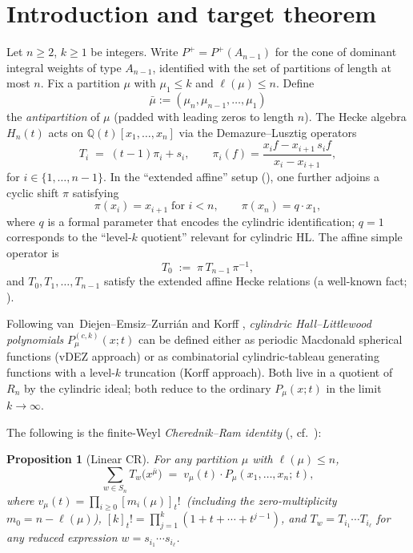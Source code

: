 \documentclass[11pt]{article}
\newtheorem{proposition}[theorem]{Proposition}
\theoremstyle{definition}
\newcommand{\bmu}{\bar{\mu}}
\newcommand{\Q}{\mathbb{Q}}
\newcommand{\Sn}{S_n}
\begin{document}
\section{Introduction and target theorem}
\label{sec:intro}

Let $n \ge 2$, $k \ge 1$ be integers. Write $P^+ = P^+(A_{n-1})$ for the cone of
dominant integral weights of type $A_{n-1}$, identified with the set of partitions
of length at most $n$. Fix a partition $\mu$ with $\mu_1 \le k$ and $\ell(\mu) \le n$.
Define
\[
\bmu := (\mu_n, \mu_{n-1}, \ldots, \mu_1)
\]
the \emph{antipartition} of $\mu$ (padded with leading zeros to length $n$).
The Hecke algebra $H_n(t)$ acts on $\Q(t)[x_1, \ldots, x_n]$ via the
Demazure--Lusztig operators
\[
T_i \;=\; (t-1)\pi_i + s_i, \qquad
\pi_i(f) = \frac{x_i f - x_{i+1}\, s_i f}{x_i - x_{i+1}},
\]
for $i \in \{1, \ldots, n-1\}$. In the ``extended affine'' setup (\cite{Cherednik}), one further
adjoins a cyclic shift $\pi$ satisfying
\[
\pi(x_i) = x_{i+1} \; \text{for } i < n, \qquad \pi(x_n) = q \cdot x_1,
\]
where $q$ is a formal parameter that encodes the cylindric identification;
$q = 1$ corresponds to the ``level-$k$ quotient'' relevant for cylindric HL.
The affine simple operator is
\[
T_0 \;:=\; \pi\, T_{n-1}\, \pi^{-1},
\]
and $T_0, T_1, \ldots, T_{n-1}$ satisfy the extended affine Hecke relations
(a well-known fact; \cite{Macdonald2003}).

Following van~Diejen--Emsiz--Zurri\'an \cite[Prop.~5.1]{vDEZ2021} and Korff \cite{Korff2013},
\emph{cylindric Hall--Littlewood polynomials} $P^{(c,k)}_\mu(x;t)$ can be
defined either as periodic Macdonald spherical functions (vDEZ approach) or
as combinatorial cylindric-tableau generating functions with a
level-$k$ truncation (Korff approach). Both live in a quotient of $R_n$ by the
cylindric ideal; both reduce to the ordinary $P_\mu(x;t)$ in the limit $k \to \infty$.

The following is the finite-Weyl \emph{Cherednik--Ram identity}
(\cite{CR}, cf.\ \cite{ClioLinear}):
\begin{proposition}[Linear CR]\label{prop:linear-cr}
For any partition $\mu$ with $\ell(\mu) \le n$,
\begin{equation}
\sum_{w \in \Sn} T_w\bigl(x^{\bmu}\bigr) \;=\; v_\mu(t) \cdot P_\mu(x_1, \ldots, x_n;\, t),
\label{eq:linear-cr}
\end{equation}
where $v_\mu(t) = \prod_{i \ge 0}[m_i(\mu)]_t!\,$ (including the zero-multiplicity
$m_0 = n - \ell(\mu)$), $[k]_t! = \prod_{j=1}^k(1+t+\cdots+t^{j-1})$, and
$T_w = T_{i_1} \cdots T_{i_\ell}$ for any reduced expression
$w = s_{i_1}\cdots s_{i_\ell}$.
\end{proposition}
\end{document}
